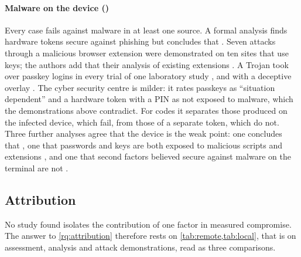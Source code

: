 \paragraph{Malware on the device ()}
Every case fails against malware in at least one source.
A formal analysis finds hardware tokens secure against phishing but
concludes that
.
Seven attacks through a malicious browser extension were demonstrated on
ten sites that use keys; the authors add that their analysis of existing
extensions
.
A Trojan took over passkey logins in every trial of one laboratory
study \autocite{Mitra2026WoodenHorse}, and with a deceptive overlay
.
The cyber security centre is milder: it rates passkeys as
\enquote{situation dependent} and a hardware token with a PIN as not
exposed to malware, which the demonstrations above contradict.
For codes it separates those produced on the infected device, which
fail, from those of a separate token, which do not.
Three further analyses agree that the device is the weak point: one
concludes that
, one that passwords and keys are
both exposed to malicious scripts and extensions
\autocite[\abso]{Gautam2025Secret}, and one that second factors
believed secure against malware on the terminal are not
\autocite[\abso]{Mahdad2023SoK2FA}.

\subsection{Attribution}\label{sec:res-attribution}

No study found isolates the contribution of one factor in measured
compromise.
The answer to \cref{rq:attribution} therefore rests on
\cref{tab:remote,tab:local}, that is on assessment, analysis and attack
demonstrations, read as three comparisons.

